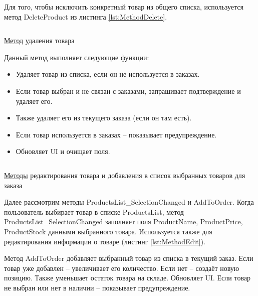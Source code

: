\documentclass[12pt]{article}
\newcommand{\colorGIT}[1]{\textcolor{CtpLavender}{#1}}
\renewcommand{\texttt}[1]{{\small\ttfamily #1}}
\begin{document}
Для того, чтобы исключить конкретный товар из общего списка, используется метод \texttt{Delete\-Product} из листинга \ref{lst:MethodDelete}.


\begin{listing}[H]
	\inputminted[firstline=112, lastline=141]{csharp}{../../3lab/StoreManager/MainWindow.xaml.cs}
	\caption{\colorGIT{\href{https://github.com/WebMasterIT/Csharp_Labs/blob/ec375afd16c0647b337cf3d8a79c8bef904fc1be/3lab/StoreManager/MainWindow.xaml.cs\#L112-L141}{Метод}} удаления товара}
	\label{lst:MethodDelete}
\end{listing}

\noindent Данный метод выполняет следующие функции:
\begin{itemize}
	\item Удаляет товар из списка, если он не используется в заказах.
	\item Если товар выбран и не связан с заказами, запрашивает подтверждение и удаляет его.
	\item Также удаляет его из текущего заказа (если он там есть).
	\item Если товар используется в заказах -- показывает предупреждение.
	\item Обновляет \texttt{UI} и очищает поля.
\end{itemize}


\begin{listing}[H]
	\inputminted[firstline=143, lastline=184]{csharp}{../../3lab/StoreManager/MainWindow.xaml.cs}
	\caption{\colorGIT{\href{https://github.com/WebMasterIT/Csharp_Labs/blob/ec375afd16c0647b337cf3d8a79c8bef904fc1be/3lab/StoreManager/MainWindow.xaml.cs\#L143-L184}{Методы}} редактирования товара и добавления в список выбранных товаров для заказа}
	\label{lst:MethodEdit}
\end{listing}

Далее рассмотрим методы \texttt{ProductsList\_SelectionChanged} и \texttt{AddToOrder}. Когда пользователь выбирает товар в списке \texttt{ProductsList}, метод \texttt{ProductsList\_SelectionChanged} заполняет поля \texttt{Product\-Name}, \texttt{ProductPrice}, \texttt{ProductStock} данными выбранного товара. Используется также для редактирования информации о товаре (листинг \ref{lst:MethodEdit}).

Метод \texttt{AddToOrder} добавляет выбранный товар из списка в текущий заказ.
Если товар уже добавлен -- увеличивает его количество.
Если нет -- создаёт новую позицию.
Также уменьшает остаток товара на складе.
Обновляет \texttt{UI}.
Если товар не выбран или нет в наличии -- показывает предупреждение.
\end{document}
